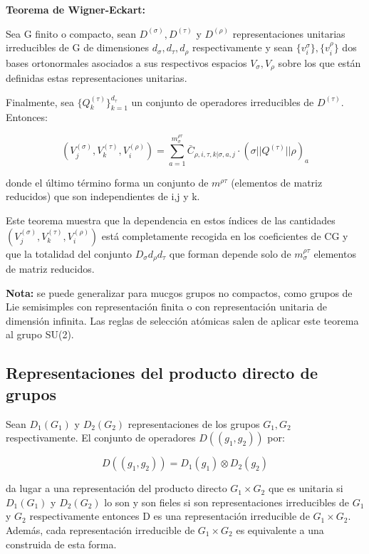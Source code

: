 \documentclass{article}
\begin{document}
       \smallskip
       \textbf{Teorema de Wigner-Eckart:}

\smallskip
Sea G finito o compacto, sean $D^{(\sigma)}, D^{(\tau)}$ y $D^{(\rho)}$ representaciones unitarias irreducibles de G de dimensiones $d_\sigma,d_\tau, d_\rho$ respectivamente y sean $\lbrace v_i^{\sigma}\rbrace, \lbrace v_i^{\rho}\rbrace $ dos bases ortonormales asociados a sus respectivos espacios $V_\sigma, V_\rho$ sobre los que están definidas estas representaciones unitarias.

Finalmente, sea $\lbrace Q_k^{(\tau)} \rbrace _{k=1}^{d_\tau}$ un conjunto de operadores irreducibles de $D^{(\tau)}$. Entonces:

$$(V_j^{(\sigma)}, V_k^{(\tau)}, V_i^{(\rho)})=\sum _{a=1}^{m_\sigma ^{\rho \tau}} \bar{C}_{\rho, i, \tau ,k | \sigma , a, j}\cdot (\sigma || Q^{(\tau)}||\rho)_a$$

donde el último término forma un conjunto de $m^{\rho \tau}$ (elementos de matriz reducidos) que son independientes de i,j y k.

Este teorema muestra que la dependencia en estos índices de las cantidades $(V_j^{(\sigma)}, V_k^{(\tau)}, V_i^{(\rho)})$ está completamente recogida en los coeficientes de CG y que la totalidad del conjunto $D_\sigma d_\rho d_\tau$ que forman depende solo de $m^{\rho \tau}_\sigma$ elementos de matriz reducidos.

\smallskip
\textbf{Nota:} se puede generalizar para mucgos grupos no compactos, como grupos de Lie semisimples con representación finita o con representación unitaria de dimensión infinita.
Las reglas de selección atómicas salen de aplicar este teorema al grupo SU(2).

\subsection{Representaciones del producto directo de grupos}

Sean $D_1(G_1)$ y $D_2 (G_2)$ representaciones de los grupos $G_1, G_2$ respectivamente. El conjunto de operadores $D((g_1,g_2))$ por:

$$D((g_1,g_2))=D_1(g_1)\otimes D_2(g_2)$$

da lugar a una representación del producto directo $G_1\times G_2$ que es unitaria si $D_1(G_1)$ y $D_2(G_2)$ lo son y son fieles si son representaciones irreducibles de $G_1$ y $G_2$ respectivamente entonces D es una representación irreducible de $G_1 \times G_2$. Además, cada representación irreducible de $G_1 \times G_2$ es equivalente a una construida de esta forma.
\end{document}
